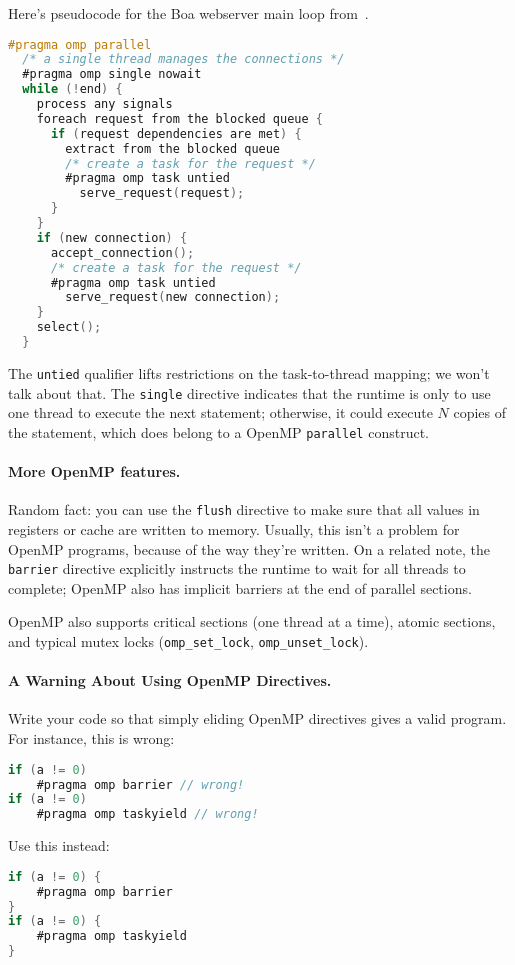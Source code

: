 Here's pseudocode for the Boa webserver main loop from~\cite{Ayguade:2009:DOT:1512157.1512430}.
{\small
\begin{lstlisting}[language=C,morekeywords={foreach,pragma,omp,parallel,single,nowait,task,untied,barrier,taskyield}]
#pragma omp parallel
  /* a single thread manages the connections */
  #pragma omp single nowait
  while (!end) {
    process any signals
    foreach request from the blocked queue {
      if (request dependencies are met) {
        extract from the blocked queue
        /* create a task for the request */
        #pragma omp task untied
          serve_request(request);
      }
    }
    if (new connection) {
      accept_connection();
      /* create a task for the request */
      #pragma omp task untied
        serve_request(new connection);
    }
    select();
  }
\end{lstlisting}
}
The {\tt untied} qualifier lifts restrictions on the task-to-thread mapping;
we won't talk about that. The {\tt single} directive indicates that the
runtime is only to use one thread to execute the next statement; otherwise,
it could execute $N$ copies of the statement, which does belong to a
OpenMP {\tt parallel} construct.

\paragraph{More OpenMP features.} 
Random fact: you can use the {\tt flush} directive to make sure that
all values in registers or cache are written to memory. Usually, this
isn't a problem for OpenMP programs, because of the way they're
written. On a related note, the {\tt barrier} directive explicitly
instructs the runtime to wait for all threads to complete; OpenMP also
has implicit barriers at the end of parallel sections.  

OpenMP also supports critical sections (one thread at a time), atomic
sections, and typical mutex locks (\verb+omp_set_lock+,
\verb+omp_unset_lock+).

\paragraph{A Warning About Using OpenMP Directives.}
  Write your code so that simply eliding OpenMP directives gives a valid program. For instance, this is wrong:
  \begin{lstlisting}[language=C,morekeywords={foreach,pragma,omp,parallel,single,nowait,task,untied,barrier,taskyield}]
if (a != 0)
    #pragma omp barrier // wrong!
if (a != 0)
    #pragma omp taskyield // wrong!
  \end{lstlisting}

  Use this instead:
  \begin{lstlisting}[language=C,morekeywords={foreach,pragma,omp,parallel,single,nowait,task,untied,barrier,taskyield}]
if (a != 0) {
    #pragma omp barrier
}
if (a != 0) {
    #pragma omp taskyield
}
  \end{lstlisting}







